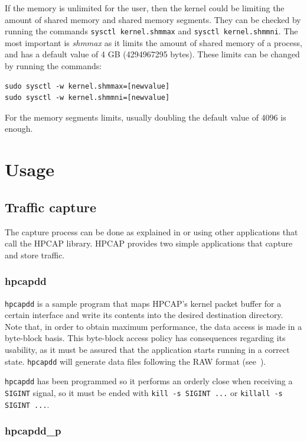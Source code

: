 \documentclass[a4paper,oneside]{hpman}
\begin{document}
If the memory is unlimited for the user, then the kernel could be limiting the amount of shared memory and shared memory segments. They can be checked by running the commands \texttt{sysctl kernel.shmmax} and \texttt{sysctl kernel.shmmni}. The most important is \textit{shmmax} as it limits the amount of shared memory of a process, and has a default value of 4 GB (4294967295 bytes). These limits can be changed by running the commands:
\begin{verbatim}
sudo sysctl -w kernel.shmmax=[newvalue]
sudo sysctl -w kernel.shmmni=[newvalue]
\end{verbatim}

For the memory segments limits, usually doubling the default value of 4096 is enough.

\chapter{Usage}
\label{sec:DriverUsage}

\section{Traffic capture}
\label{sec:Capture}

The capture process can be done as explained in  or using other applications that call the HPCAP library. HPCAP provides two simple applications that capture and store traffic.

\subsection{hpcapdd}
\label{sec:hpcapdd}

\texttt{hpcapdd} is a sample program that maps HPCAP's kernel packet buffer for a certain interface and write its contents into the desired destination directory.
Note that, in order to obtain maximum performance, the data access is made in a byte-block basis. This byte-block access policy has consequences regarding its usability, as it must be assured that the application starts running in a correct state.
\texttt{hpcapdd} will generate data files following the RAW format (see~).

\texttt{hpcapdd} has been programmed so it performs an orderly close when receiving a \texttt{SIGINT} signal, so it must be ended with \texttt{kill -s SIGINT ...} or \texttt{killall -s SIGINT ...}.

\subsection{hpcapdd\_p}
\label{sec:hpcapddp}
\end{document}

